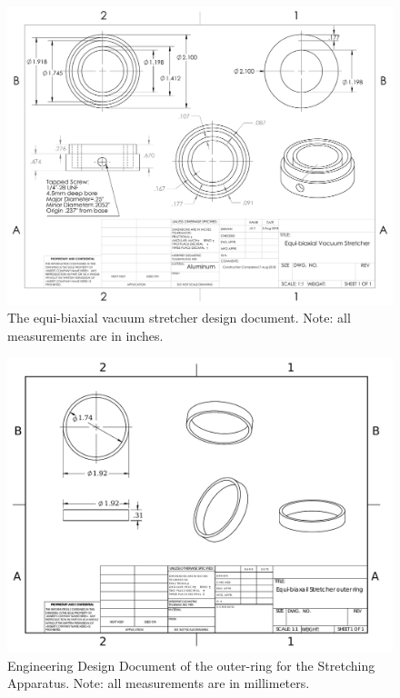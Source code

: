 \begin{figure}[h!]	

	\vspace{-3.7em}
	\centerline{\includegraphics[scale=.65]{Chapters/Figures/Stretcher_body_with_screwtap_updated.PDF}}
	 
	\caption[Stretching Apparatus Design Document]{The equi-biaxial vacuum stretcher design document. Note: all measurements are in inches.}
	
	\label{fig:stretcherDesignBase}
\end{figure}


\begin{figure}[h!]
	
	
	\centerline{\includegraphics[scale=.85]{Chapters/Figures/Stretcher_outer.pdf}}
	\vspace{-.7em}
	\caption[Stretcher outer-ring]{Engineering Design Document of the outer-ring for the Stretching Apparatus. Note: all measurements are in millimeters.}
	
	\label{fig:stretcherDesignRing}
\end{figure}

